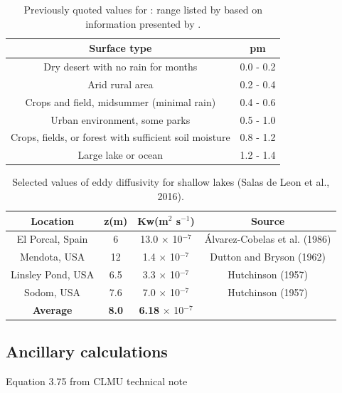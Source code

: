 \documentclass[final,3p,times,authoryear]{elsarticle}
\begin{document}
\begin{table}[!htbp]
\caption{Previously quoted values for : range listed by \cite{Hanna1992} based on information presented by \cite{Beljaars1991}.}  
\label{tab:surftype}
  \begin{tabular}{   c  c } 
	\hline  \textbf{Surface type} & \textbf{pm}  \\ \hline
	Dry desert with no rain for months & 0.0 - 0.2   \\ 
	Arid rural area & 0.2 - 0.4    \\ 
	Crops and field, midsummer (minimal rain) & 0.4 - 0.6   \\ 
	Urban environment, some parks & 0.5 - 1.0   \\ 
	Crops, fields, or forest with sufficient soil moisture & 0.8 - 1.2  \\ 
	Large lake or ocean & 1.2 - 1.4  \\ \hline	
  \end{tabular} 
\end{table}


\begin{table}[!htbp]
\caption{Selected values of eddy diffusivity for shallow lakes (Salas de Leon et al., 2016).}  
\label{tab:eddydiff}
  \begin{tabular}{   c  c  c c} 
	\hline  \textbf{Location} & \textbf{z(m)} & \textbf{Kw(m$^{2}$ s$^{-1}$)} & \textbf{Source} \\ \hline
El Porcal, Spain & 6 & 13.0 $\times$ 10$^{-7}$ & \'{A}lvarez-Cobelas et al. (1986)  \\ 
Mendota, USA &12&1.4 $\times$ 10$^{-7}$&Dutton and Bryson (1962)\\ 
Linsley Pond, USA&6.5&3.3 $\times$ 10$^{-7}$&Hutchinson (1957)\\ 
Sodom, USA&7.6&7.0 $\times$ 10$^{-7}$&Hutchinson (1957)\\ \hline
\textbf{Average}&\textbf{8.0}&\textbf{6.18} $\times$ 10$^{-7}$&\\ \hline
	
  \end{tabular} 
\end{table}




\subsection{Ancillary calculations}\label{app:calc}  


 
Equation 3.75 from CLMU technical note \citep{Oleson2010}
\end{document}
